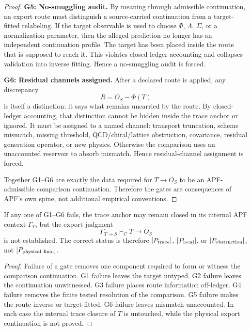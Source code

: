 \begin{proof}
\smallskip
\noindent\textbf{G5: No-smuggling audit.}
By meaning through admissible continuation, an export route must distinguish a source-carried continuation from a target-fitted relabeling.  If the target observable is used to choose $\Phi$, $\Lambda$, $\Sigma$, or a normalization parameter, then the alleged prediction no longer has an independent continuation profile.  The target has been placed inside the route that is supposed to reach it.  This violates closed-ledger accounting and collapses validation into inverse fitting.  Hence a no-smuggling audit is forced.

\smallskip
\noindent\textbf{G6: Residual channels assigned.}
After a declared route is applied, any discrepancy
\[
        R=O_S-\Phi(T)
\]
is itself a distinction: it says what remains uncarried by the route.  By closed-ledger accounting, that distinction cannot be hidden inside the trace anchor or ignored.  It must be assigned to a named channel: transport truncation, scheme mismatch, missing threshold, QCD/chiral/lattice obstruction, covariance, residual generation operator, or new physics.  Otherwise the comparison uses an unaccounted reservoir to absorb mismatch.  Hence residual-channel assignment is forced.

\smallskip
Together G1--G6 are exactly the data required for $T\to O_S$ to be an APF-admissible comparison continuation.  Therefore the gates are consequences of APF's own spine, not additional empirical conventions.  \qedhere
\end{proof}

\begin{corollary}
If any one of G1--G6 fails, the trace anchor may remain closed in its internal APF context $\Gamma_T$, but the export judgment
\[
        \Gamma_{T\to S}\vdash_C T\to O_S
\]
is not established.  The correct status is therefore $[P_{\rm trace}]$, $[P_{\rm local}]$, or $[P_{\rm obstruction}]$, not $[P_{\rm physical\ final}]$.
\end{corollary}

\begin{proof}
Failure of a gate removes one component required to form or witness the comparison continuation.  G1 failure leaves the target untyped.  G2 failure leaves the continuation unwitnessed.  G3 failure places route information off-ledger.  G4 failure removes the finite tested resolution of the comparison.  G5 failure makes the route inverse or target-fitted.  G6 failure leaves mismatch unaccounted.  In each case the internal trace closure of $T$ is untouched, while the physical export continuation is not proved.  \qedhere
\end{proof}

